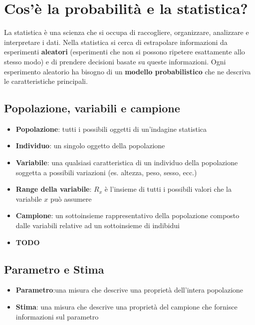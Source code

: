 \documentclass[a4paper]{article}
\theoremstyle{break}
\theoremstyle{break}
\theoremstyle{break}
\theoremstyle{break}
\begin{document}


\tableofcontents
\pagebreak


\section{Cos'è la probabilità e la statistica?}
La statistica è una scienza che si occupa di raccogliere, organizzare, analizzare
e interpretare i dati. Nella statistica si cerca di estrapolare informazioni da
esperimenti \textbf{aleatori} (esperimenti che non si possono ripetere esattamente allo stesso
modo) e di prendere decisioni basate su queste informazioni. Ogni esperimento aleatorio
ha bisogno di un \textbf{modello probabilistico} che ne descriva le caratteristiche principali.

\subsection{Popolazione, variabili e campione}
\begin{itemize}
	\item \textbf{Popolazione}: tutti i possibili oggetti di un'indagine statistica
	\item \textbf{Individuo}: un singolo oggetto della popolazione
	\item \textbf{Variabile}: una qualsiasi caratteristica di un individuo della
	      popolazione soggetta a possibili variazioni (es. altezza, peso, sesso, ecc.)
	\item \textbf{Range della variabile}: \( R_x \) è l'insieme di tutti i possibili
	      valori che la variabile \( x \) può assumere
	\item \textbf{Campione}: un sottoinsieme rappresentativo della popolazione
	      composto dalle variabili relative ad un sottoinsieme di indibidui
	\item \textbf{TODO}
\end{itemize}

\subsection{Parametro e Stima}
\begin{itemize}
	\item \textbf{Parametro}:una misura che descrive una proprietà dell'intera popolazione
	\item \textbf{Stima}: una misura che descrive una proprietà del campione che
	      fornisce informazioni sul parametro
\end{itemize}
\end{document}
